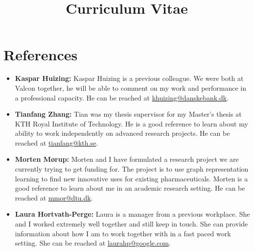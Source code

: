 \documentclass[11pt,a4paper]{moderncv}
\title{Curriculum Vitae}
\begin{document}
\section*{References}

\begin{itemize}
    \item \textbf{Kaspar Huizing:} Kaspar Huizing is a previous colleague. We were both at Valcon together, he will be able to comment on my work and performance in a professional capacity. He can be reached at \href{mailto:khuizing@danskebank.dk}{khuizing@danskebank.dk}.
    \item \textbf{Tianfang Zhang:} Tian was my thesis supervisor for my Master's thesis at KTH Royal Institute of Technology. He is a good reference to learn about my ability to work independently on advanced research projects. He can be reached at \href{mailto:tianfang@kth.se}{tianfang@kth.se}.
    \item \textbf{Morten Mørup:} Morten and I have formulated a research project we are currently trying to get funding for. The project is to use graph representation learning to find new innovative uses for existing pharmaceuticals. Morten is a good reference to learn about me in an academic research setting. He can be reached at \href{mailto:mmor@dtu.dk}{mmor@dtu.dk}.
    \item \textbf{Laura Hortvath-Perge:} Laura is a manager from a previous workplace. She and I worked extremely well together and still keep in touch. She can provide information about how I am to work together with in a fast paced work setting. She can be reached at \href{mailto:laurahp@google.com}{laurahp@google.com}.
\end{itemize}
\end{document}
